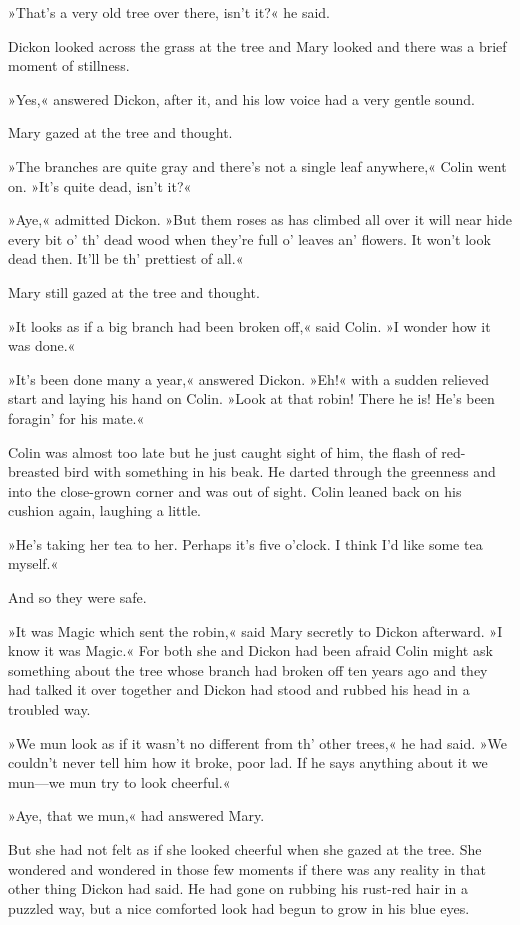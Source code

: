 »That's a very old tree over there, isn't it?« he said.

Dickon looked across the grass at the tree and Mary looked and there was a brief moment of stillness.

»Yes,« answered Dickon, after it, and his low voice had a very gentle sound.

Mary gazed at the tree and thought.

»The branches are quite gray and there's not a single leaf anywhere,« Colin went on. »It's quite dead, isn't it?«

»Aye,« admitted Dickon. »But them roses as has climbed all over it will near hide every bit o' th' dead wood when they're full o' leaves an' flowers. It won't look dead then. It'll be th' prettiest of all.«

Mary still gazed at the tree and thought.

»It looks as if a big branch had been broken off,« said Colin. »I wonder how it was done.«

»It's been done many a year,« answered Dickon. »Eh!« with a sudden relieved start and laying his hand on Colin. »Look at that robin! There he is! He's been foragin' for his mate.«

Colin was almost too late but he just caught sight of him, the flash of red-breasted bird with something in his beak. He darted through the greenness and into the close-grown corner and was out of sight. Colin leaned back on his cushion again, laughing a little.

»He's taking her tea to her. Perhaps it's five o'clock. I think I'd like some tea myself.«

And so they were safe.

»It was Magic which sent the robin,« said Mary secretly to Dickon afterward. »I know it was Magic.« For both she and Dickon had been afraid Colin might ask something about the tree whose branch had broken off ten years ago and they had talked it over together and Dickon had stood and rubbed his head in a troubled way.

»We mun look as if it wasn't no different from th' other trees,« he had said. »We couldn't never tell him how it broke, poor lad. If he says anything about it we mun—we mun try to look cheerful.«

»Aye, that we mun,« had answered Mary.

But she had not felt as if she looked cheerful when she gazed at the tree. She wondered and wondered in those few moments if there was any reality in that other thing Dickon had said. He had gone on rubbing his rust-red hair in a puzzled way, but a nice comforted look had begun to grow in his blue eyes.


